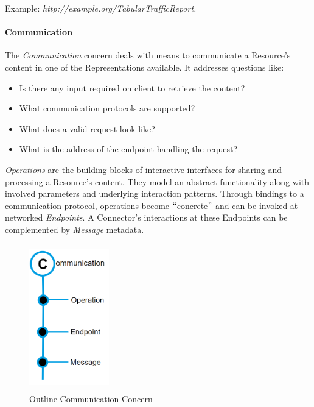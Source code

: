 Example: \textit{http://example.org/TabularTrafficReport.}\par

\paragraph{Communication\\}


The \textit{Communication }concern deals with means to communicate a Resource’s content in one of the Representations available. It addresses questions like:  \begin{itemize}
	\item Is there any input required on client to retrieve the content?  	
	\item What communication protocols are supported? 
 	\item What does a valid request look like? 
 	\item What is the address of the endpoint handling the request?
\end{itemize} 
 \textit{Operations} are the building blocks of interactive interfaces for sharing and processing a Resource’s content. They model an abstract functionality along with involved parameters and underlying interaction patterns. Through bindings to a communication protocol, operations become $``$concrete$"$  and can be invoked at networked \textit{Endpoints}. A Connector’s interactions at these Endpoints can be complemented by \textit{Message} metadata.


\begin{figure}[H]
	\begin{Center}
		\includegraphics[width=1.36in,height=2.5in]{./media/image39.png}
		\caption{Outline Communication Concern}
		\label{fig:outline_communication_concern}
	\end{Center}
\end{figure}



